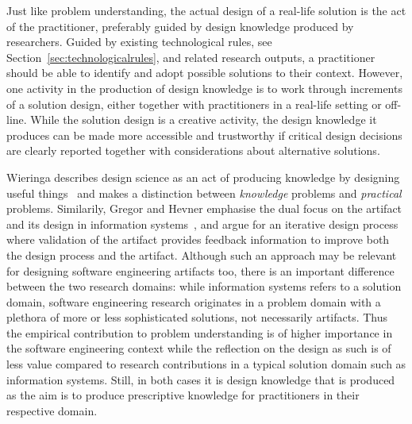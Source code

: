 \documentclass[graybox]{svmult}
\begin{document}


Just like problem understanding, the actual design of a real-life solution is the act of the practitioner, preferably guided by design knowledge produced by researchers. %
Guided by existing technological rules, see Section~\ref{sec:technologicalrules}, and related research outputs, a practitioner should be able to identify and adopt possible solutions to their context. However, one activity in the production of design knowledge is to work through increments of a solution design, either together with practitioners in a real-life setting or off-line. %
While the solution design is a creative activity, the design knowledge it produces can be made more accessible and trustworthy if critical design decisions are clearly reported together with considerations about alternative solutions.





Wieringa describes design science as an act of producing knowledge by designing useful things~\cite{wieringa_design_2009} and makes a distinction between \emph{knowledge} problems and \emph{practical} problems. Similarily, Gregor and Hevner emphasise the dual focus on the artifact and its design in information systems~\cite{gregor_positioning_2013}, and argue for an iterative design process where validation of the artifact provides feedback information to improve both the design process and the artifact. Although such an approach may be relevant for designing software engineering artifacts too, there is an important difference between the two research domains: while information systems refers to a solution domain, software engineering research originates in a problem domain with a plethora of more or less sophisticated solutions, not necessarily artifacts. Thus the empirical contribution to problem understanding is of higher importance in the software engineering context while the reflection on the design as such is of less value compared to research contributions in a typical solution domain such as information systems. Still, in both cases it is design knowledge that is produced as the aim is to produce prescriptive knowledge for practitioners in their respective domain. 
\end{document}
